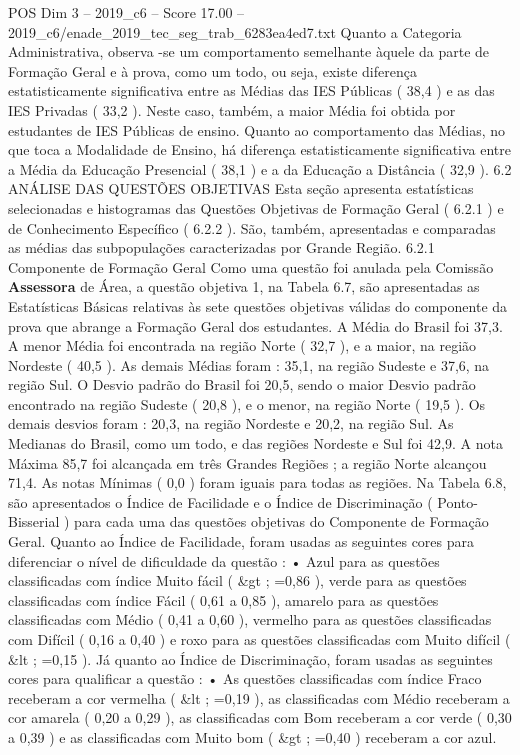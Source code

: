 \begin{textsample}{POS Dim 3 – 2019\_c6 – Score 17.00 – 2019\_c6/enade\_2019\_tec\_seg\_trab\_6283ea4ed7.txt}
Quanto a Categoria Administrativa, observa -se um comportamento semelhante àquele da parte de Formação Geral e à prova, como um todo, ou seja, existe diferença estatisticamente significativa entre as Médias das IES Públicas ( 38,4 ) e as das IES Privadas ( 33,2 ).
Neste caso, também, a maior Média foi obtida por estudantes de IES Públicas de ensino.
Quanto ao comportamento das Médias, no que toca a Modalidade de Ensino, há diferença estatisticamente significativa entre a Média da Educação Presencial ( 38,1 ) e a da Educação a Distância ( 32,9 ). 6.2 ANÁLISE DAS QUESTÕES OBJETIVAS Esta seção apresenta estatísticas selecionadas e histogramas das Questões Objetivas de Formação Geral ( 6.2.1 ) e de Conhecimento Específico ( 6.2.2 ).
São, também, apresentadas e comparadas as médias das subpopulações caracterizadas por Grande Região. 6.2.1 Componente de Formação Geral Como uma questão foi anulada pela Comissão \textbf{Assessora} de Área, a questão objetiva 1, na Tabela 6.7, são apresentadas as Estatísticas Básicas relativas às sete questões objetivas válidas do componente da prova que abrange a Formação Geral dos estudantes.
A Média do Brasil foi 37,3.
A menor Média foi encontrada na região Norte ( 32,7 ), e a maior, na região Nordeste ( 40,5 ).
As demais Médias foram : 35,1, na região Sudeste e 37,6, na região Sul.
O Desvio padrão do Brasil foi 20,5, sendo o maior Desvio padrão encontrado na região Sudeste ( 20,8 ), e o menor, na região Norte ( 19,5 ).
Os demais desvios foram : 20,3, na região Nordeste e 20,2, na região Sul.
As Medianas do Brasil, como um todo, e das regiões Nordeste e Sul foi 42,9.
A nota Máxima 85,7 foi alcançada em três Grandes Regiões ; a região Norte alcançou 71,4.
As notas Mínimas ( 0,0 ) foram iguais para todas as regiões.
Na Tabela 6.8, são apresentados o Índice de Facilidade e o Índice de Discriminação ( Ponto-Bisserial ) para cada uma das questões objetivas do Componente de Formação Geral.
Quanto ao Índice de Facilidade, foram usadas as seguintes cores para diferenciar o nível de dificuldade da questão : • Azul para as questões classificadas com índice Muito fácil ( \&gt ; =0,86 ), verde para as questões classificadas com índice Fácil ( 0,61 a 0,85 ), amarelo para as questões classificadas com Médio ( 0,41 a 0,60 ), vermelho para as questões classificadas com Difícil ( 0,16 a 0,40 ) e roxo para as questões classificadas com Muito difícil ( \&lt ; =0,15 ).
Já quanto ao Índice de Discriminação, foram usadas as seguintes cores para qualificar a questão : • As questões classificadas com índice Fraco receberam a cor vermelha ( \&lt ; =0,19 ), as classificadas com Médio receberam a cor amarela ( 0,20 a 0,29 ), as classificadas com Bom receberam a cor verde ( 0,30 a 0,39 ) e as classificadas com Muito bom ( \&gt ; =0,40 ) receberam a cor azul.

\end{textsample}
